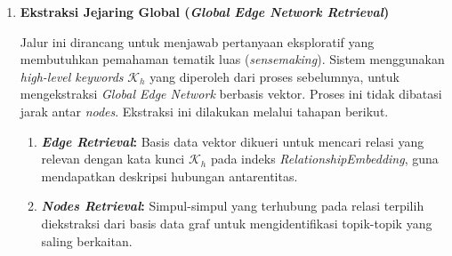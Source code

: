 \begin{enumerate}[label=\textbf{\arabic*.}, leftmargin=*, itemsep=10pt, listparindent=0.75cm]
\begin{enumerate}[label=\textbf{\alph*.}, leftmargin=*, itemsep=5pt, listparindent=0.75cm]
                    Proses ini menghasilkan konteks lokal terstruktur (\ref{fig:pembentukan-subgraf}). Hasil akhir terdiri atas entitas ($\mathcal{E}$), relasi ($\mathcal{R}$), dan unit teks ($\mathcal{T}$). Formulasi konteks lokal $\text{pipeline}_{\text{local}}(\mathcal{K}_l, G)$ \citep{chen2025acadrag} dituliskan sebagai berikut:
                    \begin{align}
                        \mathcal{L}_{\text{local}} & = (\mathcal{E}_{\text{local}}, \mathcal{R}_{\text{local}}, \mathcal{T}_{\text{local}}), \label{eq:local_context_components} \\
                                                   & = \text{pipeline}_{\text{local}}(\mathcal{K}_l, G), \label{eq:local_context_pipeline}
                    \end{align}
                    Pada persamaan \eqref{eq:local_context_pipeline} tersebut, $\mathcal{L}_{\text{local}}$ adalah konteks hasil reduksi dari kata kunci spesifik dan struktur graf. Konteks ini memuat informasi untuk menjawab kueri. Dengan demikian, jalur lokal difokuskan pada informasi yang dekat dengan entitas target.


              \item \textbf{Ekstraksi Jejaring Global (\textit{Global Edge Network Retrieval})}

                    Jalur ini dirancang untuk menjawab pertanyaan eksploratif yang membutuhkan pemahaman tematik luas (\textit{sensemaking}). Sistem menggunakan \textit{high-level keywords} $\mathcal{K}_h$ yang diperoleh dari proses sebelumnya, untuk mengekstraksi \textit{Global Edge Network} berbasis vektor. Proses ini tidak dibatasi jarak antar \textit{nodes}. Ekstraksi ini dilakukan melalui tahapan berikut.

                    \begin{enumerate}[label=\textbf{\arabic*.}, leftmargin=*, itemsep=6pt, listparindent=0.75cm]

                        \item \textbf{\textit{Edge Retrieval}:} Basis data vektor dikueri untuk mencari relasi yang relevan dengan kata kunci $\mathcal{K}_h$ pada indeks \textit{RelationshipEmbedding}, guna mendapatkan deskripsi hubungan antarentitas.

                        \item \textbf{\textit{Nodes Retrieval}:} Simpul-simpul yang terhubung pada relasi terpilih diekstraksi dari basis data graf untuk mengidentifikasi topik-topik yang saling berkaitan.


\end{enumerate}
\end{enumerate}
\end{enumerate}
